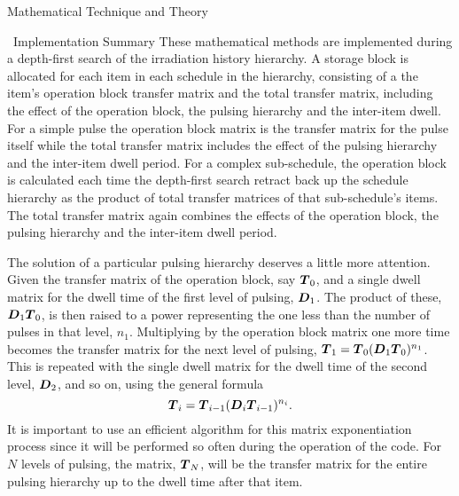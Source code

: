 \begin{chapter}{Mathematical Technique and Theory}
\begin{section}{\ALARA\ Implementation Summary}
  These mathematical methods are implemented during a depth-first
  search of the irradiation history hierarchy.  A storage block is
  allocated for each item in each schedule in the hierarchy,
  consisting of a the item's operation block transfer matrix and the
  total transfer matrix, including the effect of the operation block,
  the pulsing hierarchy and the inter-item dwell.  For a simple pulse
  the operation block matrix is the transfer matrix for the pulse
  itself while the total transfer matrix includes the effect of the
  pulsing hierarchy and the inter-item dwell period.  For a complex
  sub-schedule, the operation block is calculated each time the
  depth-first search retract back up the schedule hierarchy as the
  product of total transfer matrices of that sub-schedule's items.
  The total transfer matrix again combines the effects of the
  operation block, the pulsing hierarchy and the inter-item dwell
  period.
  
  The solution of a particular pulsing hierarchy deserves a little
  more attention.  Given the transfer matrix of the operation block,
  say $\mbox{\boldmath $T$}_0$, and a single dwell matrix for the dwell time of the
  first level of pulsing, $\mbox{\boldmath $D$}_1$.  The product of these,
  $\mbox{\boldmath $D$}_1\mbox{\boldmath $T$}_0$, is then raised to a power representing the one
  less than the number of pulses in that level, $n_1$.  Multiplying by
  the operation block matrix one more time becomes the transfer matrix
  for the next level of pulsing, $\mbox{\boldmath $T$}_1 =
  \mbox{\boldmath $T$}_0(\mbox{\boldmath $D$}_1\mbox{\boldmath $T$}_0)^{n_1}$.  This is repeated with the
  single dwell matrix for the dwell time of the second level,
  $\mbox{\boldmath $D$}_2$, and so on, using the general formula\cite{Spangler}
  \begin{equation}
    \mbox{\boldmath $T$}_i = \mbox{\boldmath $T$}_{i-1}(\mbox{\boldmath $D$}_{i}\mbox{\boldmath $T$}_{i-1})^{n_i}.
    \label{eqn:pulsing.recurse}
  \end{equation}
  It is important to use an efficient algorithm\cite{UofT_csc280}
  for this matrix exponentiation process since it will be performed so
  often during the operation of the code.  For $N$ levels of pulsing,
  the matrix, $\mbox{\boldmath $T$}_{N}$, will be the transfer matrix for the
  entire pulsing hierarchy up to the dwell time after that item.
\end{section}

\end{chapter}

